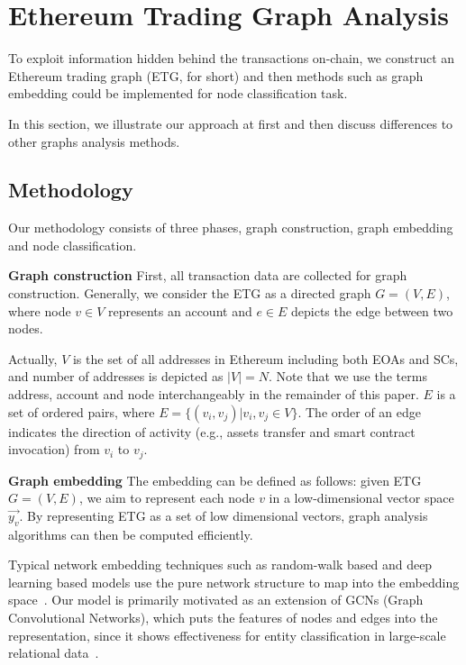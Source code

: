 
\section{Ethereum Trading Graph Analysis}
To exploit information hidden behind the transactions on-chain, we construct an Ethereum trading graph (ETG, for short) and then  methods such as graph embedding could be implemented for node classification task.

In this section, we illustrate our approach at first and then discuss differences to other graphs analysis methods.

\subsection{Methodology}
\label{subsec:methodology}
Our methodology consists of three phases, graph construction, graph embedding and node classification. 

\textbf{Graph construction}
First, all transaction data are collected for graph construction. Generally, we consider the ETG as a directed graph $G=(V,E)$, where node $v \in V$ represents an account and $e \in E$ depicts the edge between two nodes. 

Actually, $V$ is the set of all addresses in Ethereum including both EOAs and SCs, and number of addresses is depicted as $|V|=N$. Note that we use the terms address, account and node interchangeably in the remainder of this paper. $E$ is a set of ordered pairs, where $E=\{(v_i,v_j)|v_i,v_j \in V\}$. The order of an edge indicates the direction of activity (e.g., assets transfer and smart contract invocation) from $v_i$ to $v_j$. %



\textbf{Graph embedding}
The embedding can be defined as follows: given ETG $G=(V,E)$, we aim to represent each node $v$ in a low-dimensional vector space $\vec{y_v}$. By representing ETG as a set of low dimensional vectors, graph analysis algorithms can then be computed efficiently. 

Typical network embedding techniques such as random-walk based and deep learning based models use the pure network structure to map into the embedding space~\cite{goyal2018capturing}. Our model is primarily motivated as an extension of GCNs (Graph Convolutional Networks), which puts the features of nodes and edges into the representation, since it shows effectiveness for entity classification in large-scale relational data~\cite{kipf2016semi}.

